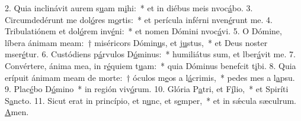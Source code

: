 2. Quia inclinávit aurem s\uline{u}am m\uline{i}hi:~* et in diébus meis nvoc\uline{á}bo.
3. Circumdedérunt me dol\uline{ó}res m\uline{o}rtis:~* et perícula inférni nven\uline{é}runt me.
4. Tribulatiónem et dol\uline{ó}rem inv\uline{é}ni:~* et nomen Dómini nvoc\uline{á}vi.
5. O Dómine, líbera ánimam meam:~† miséricors Dómin\uline{u}s, et j\uline{u}stus,~* et Deus noster mser\uline{é}tur.
6. Custódiens p\uline{á}rvulos D\uline{ó}minus:~* humiliátus sum, et lber\uline{á}vit me.
7. Convértere, ánima mea, in r\uline{é}quiem t\uline{u}am:~* quia Dóminus benefcit t\uline{i}bi.
8. Quia erípuit ánimam meam de morte:~† óculos m\uline{e}os a l\uline{á}crimis,~* pedes mes a l\uline{a}psu.
9. Plac\uline{é}bo D\uline{ó}mino~* in región viv\uline{ó}rum.
10. Glória P\uline{a}tri, et F\uline{í}lio,~* et Spiríti S\uline{a}ncto.
11. Sicut erat in princípio, et n\uline{u}nc, et s\uline{e}mper,~* et in sǽcula sæculrum. \uline{A}men.
